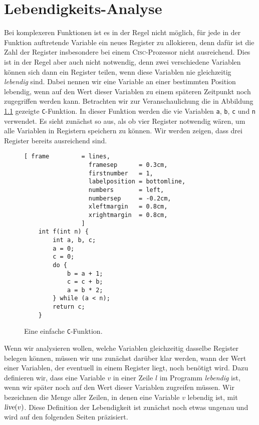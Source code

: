 \chapter{Lebendigkeits-Analyse}
Bei komplexeren Funktionen ist es in der Regel nicht m\"oglich,  f\"ur jede in der Funktion
auftretende Variable ein neues Register zu allokieren, denn daf\"ur ist die Zahl der Register
insbesondere bei einem \textsc{Cisc}-Prozessor nicht ausreichend.  Dies ist in der Regel aber auch
nicht notwendig, denn zwei verschiedene Variablen k\"onnen sich dann ein Register teilen, wenn diese
Variablen nie gleichzeitig \emph{lebendig} sind.  Dabei nennen wir eine Variable an einer bestimmten
Position lebendig, wenn auf den Wert dieser Variablen zu einem sp\"ateren Zeitpunkt noch zugegriffen
werden kann.  Betrachten wir zur Veranschaulichung die in Abbildung
\ref{fig:liveness-example-1.c} gezeigte \texttt{C}-Funktion.  In dieser Funktion werden
die vie Variablen \texttt{a}, \texttt{b}, \texttt{c} und \texttt{n} verwendet.  Es sieht
zun\"achst so aus, als ob vier Register notwendig w\"aren, um alle Variablen in Registern
speichern zu k\"onnen.  Wir werden zeigen, dass drei Register bereits ausreichend sind.

\begin{figure}[!ht]
\centering
\begin{Verbatim}[ frame         = lines, 
                  framesep      = 0.3cm, 
                  firstnumber   = 1,
                  labelposition = bottomline,
                  numbers       = left,
                  numbersep     = -0.2cm,
                  xleftmargin   = 0.8cm,
                  xrightmargin  = 0.8cm,
                ]
    int f(int n) {
        int a, b, c;
        a = 0;
        c = 0;
        do {
            b = a + 1;
            c = c + b;
            a = b * 2;
        } while (a < n);
        return c;
    }
\end{Verbatim}
\vspace*{-0.3cm}
\caption{Eine einfache \texttt{C}-Funktion.}
\label{fig:liveness-example-1.c}
\end{figure}

Wenn wir analysieren wollen, welche Variablen gleichzeitig dasselbe Register belegen
k\"onnen,  m\"ussen wir uns zun\"achst dar\"uber klar werden, wann der Wert einer Variablen, der
eventuell in einem Register liegt, noch ben\"otigt wird.  Dazu definieren wir, dass eine
Variable $v$ in einer Zeile $l$ im Programm \emph{lebendig} ist, wenn wir sp\"ater noch
auf den Wert dieser Variablen zugreifen m\"ussen.  Wir bezeichnen die Menge aller Zeilen, in denen eine
Variable $v$ lebendig ist, mit $\textsl{live}(v)$.  Diese Definition der Lebendigkeit ist zun\"achst noch etwas
ungenau und wird auf den folgenden Seiten pr\"azisiert.


